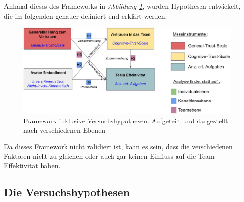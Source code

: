 \documentclass[a4paper,11pt]{article}%
\renewcommand{\\}{\vspace*{0.5\baselineskip} \newline}
\begin{document}
Anhand dieses des Frameworks in \textit{Abbildung \ref{Versuchshypothesen}}, wurden Hypothesen entwickelt, die im folgenden genauer definiert und erklärt werden.

\begin{figure}[H]
		\begin{footnotesize}
			\includegraphics[width=\textwidth]{Abbildungen/Versuchshypothesen_02.JPG}
			
			\caption{Framework inklusive Versuchshypothesen. Aufgeteilt und dargestellt nach verschiedenen Ebenen}
			\label{Versuchshypothesen}
		\end{footnotesize}
	\end{figure}	

\newpage

Da dieses Framework nicht validiert ist, kann es sein, dass die verschiedenen Faktoren nicht zu gleichen oder auch gar keinen Einfluss auf die Team-Effektivität haben.

\subsection{Die Versuchshypothesen}
\label{VersuchshypothesenAuflistung}
\end{document}
